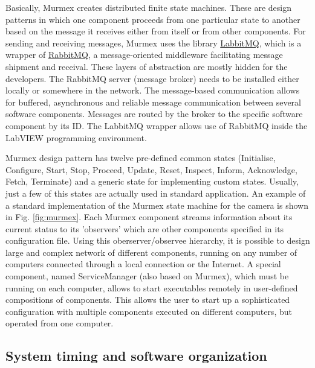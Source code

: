 \documentclass[12pt]{spieman}  %
\begin{document}
Basically, Murmex creates distributed finite state machines. These are design patterns in which one component proceeds from one particular state to another based on the message it receives either from itself or from other components. For sending and receiving messages, Murmex uses the library \href{http://sine.ni.com/nips/cds/view/p/lang/en/nid/211065}{LabbitMQ}, which is a wrapper of \href{http://www.rabbitmq.com/}{RabbitMQ}, a message-oriented middleware facilitating message shipment and receival. These layers of abstraction are mostly hidden for the developers. The RabbitMQ server (message broker) needs to be installed either locally or somewhere in the network. The message-based communication allows for buffered, asynchronous and reliable message communication between several software components. Messages are routed by the broker to the specific software component by its ID. The LabbitMQ wrapper allows use of RabbitMQ inside the LabVIEW programming environment.

Murmex design pattern has twelve pre-defined common states (Initialise, Configure, Start, Stop, Proceed, Update, Reset, Inspect, Inform, Acknowledge, Fetch, Terminate) and a generic state for implementing custom states. Usually, just a few of this states are actually used in standard application. An example of a standard implementation of the Murmex state machine for the camera is shown in Fig. \ref{fig:murmex}. Each Murmex component streams information about its current status to its 'observers' which are other components specified in its configuration file. Using this oberserver/observee hierarchy, it is possible to design large and complex network of different components, running on any number of computers connected through a local connection or the Internet. A special component, named ServiceManager (also based on Murmex), which must be running on each computer, allows to start executables remotely in user-defined compositions of components. This allows the user to start up a sophisticated configuration with multiple components executed on different computers, but operated from one computer.

\subsection{System timing and software organization}
\label{sec:timing}
\end{document}
